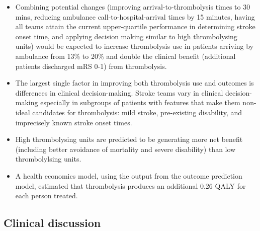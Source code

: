 \begin{itemize}
    \item Combining potential changes (improving arrival-to-thrombolysis times to 30 mins, reducing ambulance call-to-hospital-arrival times by 15 minutes, having all teams attain the current upper-quartile performance in determining stroke onset time, and applying decision making similar to high thrombolysing units) would be expected to increase thrombolysis use in patients arriving by ambulance from 13\% to 20\% and double the clinical benefit (additional patients discharged mRS 0-1) from thrombolysis.
    
    \item The largest single factor in improving both thrombolysis use and outcomes is differences in clinical decision-making. Stroke teams vary in clinical decision-making especially in subgroups of patients with features that make them non-ideal candidates for thrombolysis: mild stroke, pre-existing disability, and imprecisely known stroke onset times.
    
    \item High thrombolysing units are predicted to be generating more net benefit (including better avoidance of mortality and severe disability) than low thrombolylsing units.
    
    \item A health economics model, using the output from the outcome prediction model, estimated that thrombolysis produces an additional 0.26 QALY for each person treated.
    \end{itemize}

\subsection{Clinical discussion}
